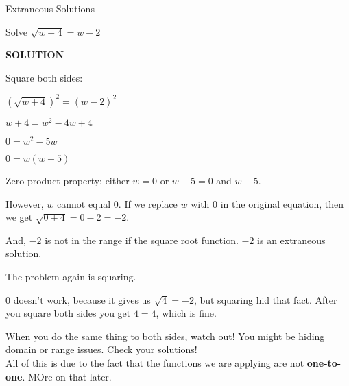 \documentclass{ximera}
\begin{document}
\begin{example} Extraneous Solutions

Solve $\sqrt{w+4} = w - 2$


\textbf{\textcolor{purple!50!blue!90!black}{SOLUTION}}

Square both sides:



$(\sqrt{w+4})^2 = (w - 2)^2$


$w + 4 = w^2 - 4w + 4$


$0 = w^2 - 5w $

$0 = w(w-5) $


Zero product property:  either $w=0$ or $w-5=0$ and $w-5$.



However, $w$ cannot equal $0$.  If we replace $w$ with $0$ in the original equation, then we get $\sqrt{0+4} = 0 - 2 = -2$.

And, $-2$ is not in the range if the square root function. $-2$ is an extraneous solution.



\end{example}


The problem again is squaring.

$0$ doesn't work, because it gives us $\sqrt{4} = -2$, but squaring hid that fact.  After you square both sides you get $4 = 4$, which is fine.





When you do the same thing to both sides, watch out!  You might be hiding domain or range issues.  Check your solutions! \\




All of this is due to the fact that the functions we are applying are not \textbf{one-to-one}.  MOre on that later.
\end{document}
